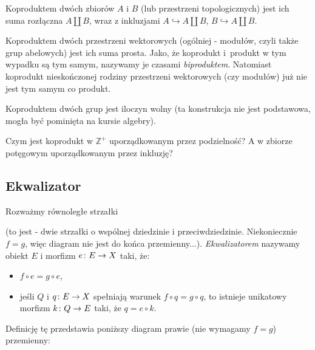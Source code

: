 \begin{exmp}
  Koproduktem dwóch zbiorów $A$ i $B$ (lub przestrzeni topologicznych) jest ich suma rozłączna $A\coprod B$, wraz z inkluzjami $A\hookrightarrow A\coprod B$, $B\hookrightarrow A\coprod B$.
\end{exmp}

\begin{exmp}
  Koproduktem dwóch przestrzeni wektorowych (ogólniej - modułów, czyli także grup abelowych) jest ich suma prosta. Jako, że koprodukt i~produkt w tym wypadku są tym samym, nazywamy je czasami \emph{biproduktem}. Natomiast koprodukt nieskończonej rodziny przestrzeni wektorowych (czy modułów) już nie jest tym samym co produkt.
\end{exmp}

\begin{exmp}
  Koproduktem dwóch grup jest iloczyn wolny (ta konstrukcja nie jest podstawowa, mogła być pominięta na kursie algebry).
\end{exmp}

\begin{exc}
  Czym jest koprodukt w $\mathbb Z^+$ uporządkowanym przez podzielność? A w zbiorze potęgowym uporządkowanym przez inkluzję?
\end{exc}

\subsection{Ekwalizator}
\begin{defn}
  Rozważmy równoległe strzałki  (to jest - dwie strzałki o wspólnej dziedzinie i przeciwdziedzinie. Niekoniecznie $f=g$, więc diagram nie jest do końca przemienny...). \emph{Ekwalizatorem} nazywamy obiekt $E$ i morfizm $e\colon E\to X$ taki, że:
  \begin{itemize}
    \item $f\circ e = g\circ e$,
    \item jeśli $Q$ i $q\colon E\to X$ spełniają warunek $f\circ q = g\circ q$, to istnieje unikatowy morfizm $k\colon Q\to E$ taki, że $q=e\circ k$.
  \end{itemize}
  Definicję tę przedstawia poniższy diagram prawie (nie wymagamy $f=g$) przemienny:
  \begin{center}
  \end{center}
\end{defn}

